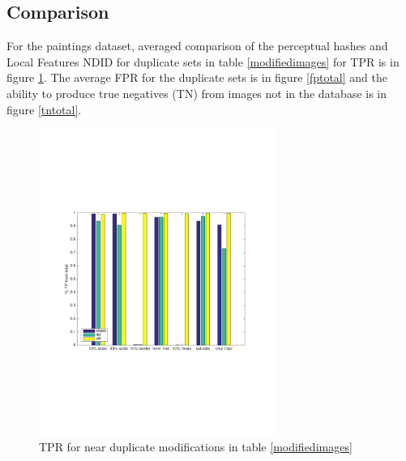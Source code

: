 \documentclass[english,12pt,a4paper,pdftex,elec,utf8]{aaltothesis}
\begin{document}
\clearpage

\subsection{Comparison}
For the paintings dataset, averaged comparison of the perceptual hashes and Local Features NDID for duplicate sets in table \ref{modifiedimages} for TPR is in figure \ref{tptotal}. The average FPR for the duplicate sets is in figure \ref{fptotal} and the ability to produce true negatives (TN) from images not in the database is in figure \ref{tntotal}.

\begin{figure}[htb]
\begin{center}
\includegraphics[height=10cm]{figures/tpBar}
\end{center}
\caption{ TPR for near duplicate modifications in table \ref{modifiedimages} }
\label{tptotal}
\end{figure}
\end{document}
